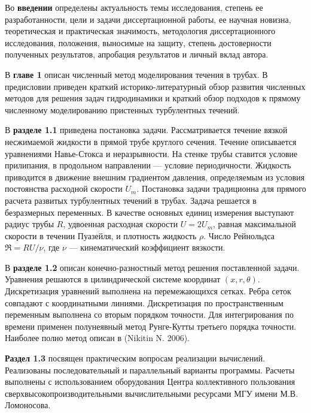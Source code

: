 Во \textbf{введении} определены актуальность темы исследования, степень ее разработанности, цели и задачи диссертационной работы, ее научная новизна, теоретическая и практическая значимость, методология диссертационного исследования, положения, выносимые на защиту, степень достоверности полученных результатов, апробация результатов и личный вклад автора. 

В {\bf главе 1} описан численный метод моделирования течения в трубах. 
В предисловии приведен краткий историко-литературный обзор развития численных методов для решения задач гидродинамики и краткий обзор подходов к прямому численному моделированию пристенных турбулентных течений. 

В \textbf{разделе 1.1} приведена постановка задачи. Рассматривается течение вязкой несжимаемой жидкости в прямой трубе круглого сечения. Течение описывается уравнениями Навье-Стокса и неразрывности. На стенке трубы ставится условие прилипания, в продольном направлении --- условие периодичности. Жидкость приводится в движение внешним градиентом давления, определяемым из условия постоянства расходной скорости $U_m$. Постановка задачи традиционна для прямого расчета развитых турбулентных течений в трубах. Задача решается в безразмерных переменных. В качестве основных единиц измерения выступают радиус трубы $R$, удвоенная расходная скорости $U = 2U_m$, равная максимальной скорости в течении Пуазейля, и плотность жидкость $\rho$. Число Рейнольдса $\Re = RU/\nu$, где $\nu$ --- кинематический коэффициент вязкости.

В \textbf{разделе 1.2} описан конечно-разностный метод решения поставленной задачи. Уравнения решаются в цилиндрической системе координат $(x,r,\theta)$. Дискретизация уравнений выполнена на перемежающихся сетках. %
Ребра сеток совпадают с координатными линиями. Дискретизация по пространственным переменным выполнена со вторым порядком точности. Для интегрирования по времени применен полунеявный метод Рунге-Кутты третьего порядка точности. Наиболее полно метод описан в (Nikitin N. 2006).

\textbf{Раздел 1.3} посвящен практическим вопросам реализации вычислений. Реализованы последовательный и параллельный варианты программы. Расчеты выполнены с использованием оборудования Центра коллективного пользования сверхвысокопроизводительными вычислительными ресурсами МГУ имени М.В.\,Ломоносова. 

